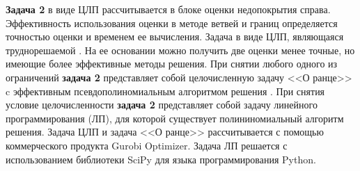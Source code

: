 \textbf{Задача 2} в виде ЦЛП рассчитывается в блоке оценки недопокрытия справа. Эффективность использования оценки в методе ветвей и границ определяется точностью оценки и временем ее вычисления. Задача в виде ЦЛП, являющаяся труднорешаемой \cite{Gari}. На ее основании можно получить две оценки менее точные, но имеющие более эффективные методы решения. При снятии любого одного из ограничений \textbf{задача 2}  представляет собой целочисленную задачу <<О ранце>> c эффективным псевдополиномиальным алгоритмом решения \cite{Gari}. При снятия условие целочисленности \textbf{задача 2} представляет собой задачу линейного программирования (ЛП), для которой существует полининомиальный алгоритм решения. Задача ЦЛП и задача <<О ранце>> рассчитывается с помощью коммерческого продукта Gurobi Optimizer. Задача ЛП решается с использованием библиотеки SciPy для языка программирования Python. 








